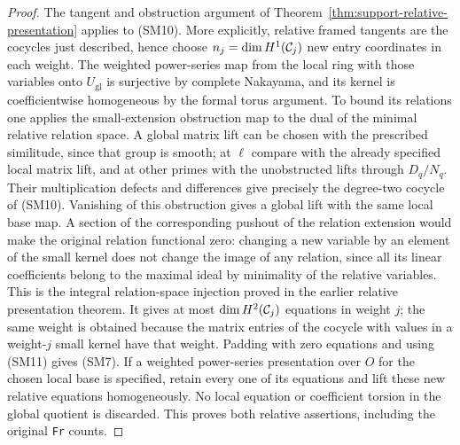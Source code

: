 \begin{proof}
The tangent and obstruction argument of
Theorem~\ref{thm:support-relative-presentation} applies
to (SM10). More explicitly, relative framed tangents
are the cocycles just described, hence choose
\(n_j=\dim H^1({\cal C}_j)\) new entry coordinates
in each weight. The weighted power-series map from
the local ring with those variables onto
\(U_{\mathrm{gl}}\) is surjective by complete
Nakayama, and its kernel is coefficientwise homogeneous
by the formal torus argument. To bound its relations
one applies the small-extension obstruction map to
the dual of the minimal relative relation space.
A global matrix lift can be chosen with the prescribed
similitude, since that group is smooth; at \(\ell\)
compare with the already specified local matrix lift,
and at other primes with the unobstructed lifts
through \(D_q/N_q\). Their multiplication defects and
differences give precisely the degree-two cocycle of
(SM10). Vanishing of this obstruction gives a global
lift with the same local base map. A section of the
corresponding pushout of the relation extension
would make the original relation functional zero:
changing a new variable by an element of the small
kernel does not change the image of any relation,
since all its linear coefficients belong to the
maximal ideal by minimality of the relative variables.
This is the integral relation-space injection proved
in the earlier relative presentation theorem.
It gives at most \(\dim H^2({\cal C}_j)\) equations
in weight \(j\); the same weight is obtained because
the matrix entries of the cocycle with values in a
weight-\(j\) small kernel have that weight. Padding
with zero equations and using (SM11) gives (SM7).
If a weighted power-series presentation over \(O\)
for the chosen local base is specified, retain every
one of its equations and lift these new relative
equations homogeneously. No local equation or
coefficient torsion in the global quotient is
discarded. This proves both relative assertions,
including the original \texttt{Fr} counts.


\end{proof}
